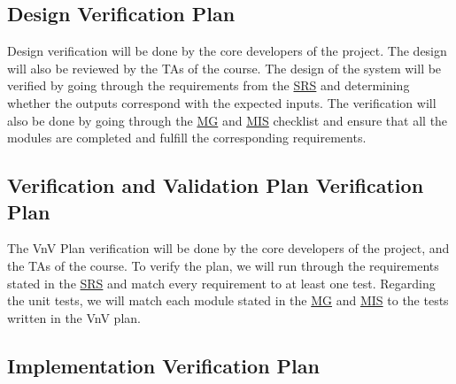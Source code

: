 \documentclass[12pt, titlepage]{article}
\begin{document}


\subsection{Design Verification Plan}

Design verification will be done by the core developers of the project. The design will also be
reviewed by the TAs of the course. The design of the system will be verified by going through the
requirements from the
\href{https://github.com/arkinmodi/project-sayyara/blob/main/docs/SRS/SRS.pdf}{SRS} and determining
whether the outputs correspond with the expected inputs. The verification will also be done by
going through the
\href{https://github.com/arkinmodi/project-sayyara/blob/main/docs/Design/MG/MG.pdf}{MG} and
\href{https://github.com/arkinmodi/project-sayyara/blob/main/docs/Design/MIS/MIS.pdf}{MIS}
checklist and ensure that all the modules are completed and fulfill the corresponding requirements.

\subsection{Verification and Validation Plan Verification Plan}

The VnV Plan verification will be done by the core developers of the project, and the TAs of the
course. To verify the plan, we will run through the requirements stated in the
\href{https://github.com/arkinmodi/project-sayyara/blob/main/docs/SRS/SRS.pdf}{SRS} and match every
requirement to at least one test. Regarding the unit tests, we will match each module stated in the
\href{https://github.com/arkinmodi/project-sayyara/blob/main/docs/Design/MG/MG.pdf}{MG} and
\href{https://github.com/arkinmodi/project-sayyara/blob/main/docs/Design/MIS/MIS.pdf}{MIS} to the
tests written in the VnV plan.




\subsection{Implementation Verification Plan}
\end{document}
